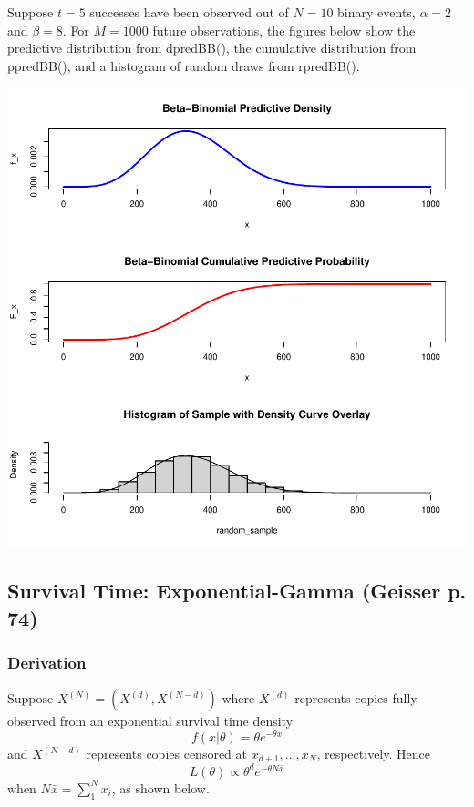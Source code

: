 \documentclass[12pt, a4paper]{article}
\begin{document}
Suppose $t=5$ successes have been observed out of $N=10$ binary events, $\alpha = 2$ and $\beta = 8$.  For $M = 1000$ future observations, the figures below show the predictive distribution from dpredBB(), the cumulative distribution from ppredBB(), and a histogram of random draws from rpredBB().


\includegraphics{Thesis-002}



    \subsection{Survival Time:  Exponential-Gamma (Geisser p. 74)}


    \subsubsection{Derivation}

      Suppose $X^{(N)} = \left(X^{(d)},X^{(N-d)}\right)$ where $X^{(d)}$ represents copies fully observed from an exponential survival time density
          $$f(x|\theta) = \theta e^{-\theta x}$$
      and $X^{(N-d)}$ represents copies censored at $x_{d+1},...,x_N$, respectively.  Hence
          $$L(\theta)\propto\theta^d e^{-\theta N\bar{x}}$$
      when $N\bar{x} = \sum_1^N{x_i}$, as shown below.\\
\end{document}
